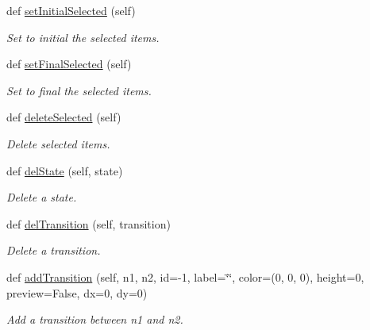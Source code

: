 \begin{DoxyCompactItemize}
def \mbox{\hyperlink{classDrawer_1_1Drawer_ab13fe2ceacf1711302f8eb5c36128ce9}{set\+Initial\+Selected}} (self)
\begin{DoxyCompactList}\small\item\em Set to initial the selected items. \end{DoxyCompactList}\item 
\mbox{\label{classDrawer_1_1Drawer_a6d5d2ae95df0cb70996724b3a0051b56}} 
def \mbox{\hyperlink{classDrawer_1_1Drawer_a6d5d2ae95df0cb70996724b3a0051b56}{set\+Final\+Selected}} (self)
\begin{DoxyCompactList}\small\item\em Set to final the selected items. \end{DoxyCompactList}\item 
\mbox{\label{classDrawer_1_1Drawer_a5b02a252ca0b197521b51a25302d0004}} 
def \mbox{\hyperlink{classDrawer_1_1Drawer_a5b02a252ca0b197521b51a25302d0004}{delete\+Selected}} (self)
\begin{DoxyCompactList}\small\item\em Delete selected items. \end{DoxyCompactList}\item 
def \mbox{\hyperlink{classDrawer_1_1Drawer_ac7bd0a70f3717fd40ff6b9360c1ff51d}{del\+State}} (self, state)
\begin{DoxyCompactList}\small\item\em Delete a state. \end{DoxyCompactList}\item 
def \mbox{\hyperlink{classDrawer_1_1Drawer_a6b36ec97121b8576eef08fb7430882a8}{del\+Transition}} (self, transition)
\begin{DoxyCompactList}\small\item\em Delete a transition. \end{DoxyCompactList}\item 
def \mbox{\hyperlink{classDrawer_1_1Drawer_aae2516d8db8154b1ec4a2396de573429}{add\+Transition}} (self, n1, n2, id=-\/1, label=\char`\"{}\char`\"{}, color=(0, 0, 0), height=0, preview=False, dx=0, dy=0)
\begin{DoxyCompactList}\small\item\em Add a transition between n1 and n2. \end{DoxyCompactList}\item 
\mbox{\label{classDrawer_1_1Drawer_ad41b61b6b2e32945584b155d4de7d571}} 

\end{DoxyCompactItemize}
